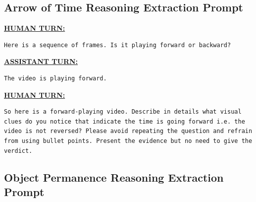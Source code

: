 \subsection{Arrow of Time Reasoning Extraction Prompt}

\begin{tcolorbox}[colback=nvidiagreen!3,colframe=nvidiagreen!75!white,title=\textsc{Arrow of Time Reasoning Extraction Prompt for forward video, backward video prompt is similar},left=0.5ex,right=0.5ex,top=0.5ex,bottom=0.5ex]
\fontsize{9.}{9.}\selectfont
\textbf{\underline{HUMAN TURN:}}
\begin{Verbatim}[breaklines=true, breaksymbolleft={}, breaksymbolright={}]
Here is a sequence of frames. Is it playing forward or backward?
\end{Verbatim}

\noindent\hdashrule{\linewidth}{0.4pt}{2pt}

\textbf{\underline{ASSISTANT TURN:}}
\begin{Verbatim}[breaklines=true, breaksymbolleft={}, breaksymbolright={}]
The video is playing forward.
\end{Verbatim}
\noindent\hdashrule{\linewidth}{0.4pt}{2pt}
\textbf{\underline{HUMAN TURN:}}
\begin{Verbatim}[breaklines=true, breaksymbolleft={}, breaksymbolright={}]
So here is a forward-playing video. Describe in details what visual clues do you notice that indicate the time is going forward i.e. the video is not reversed? Please avoid repeating the question and refrain from using bullet points. Present the evidence but no need to give the verdict.
\end{Verbatim}
\label{prompt:aot_reasoning_prompt}
\end{tcolorbox}


\subsection{Object Permanence Reasoning Extraction Prompt}

